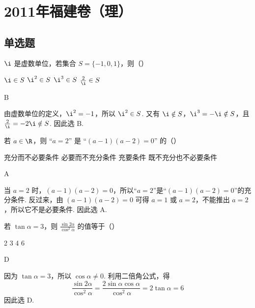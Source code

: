 \chapter{2011年福建卷（理）}

\section{单选题}

\begin{problem}
\(\i\) 是虚数单位，若集合 \(S = \{-1, 0, 1\}\)，则（\quad）

\choices
    {\(\i \in S\)}
    {\(\i^2\in S\)}
    {\(\i^3\in S\)}
    {\(\frac{2}{\i} \in S\)}
\end{problem}

\begin{answer}
B
\end{answer}

\begin{solution}
由虚数单位的定义，\(\i^2=-1\)，所以 \(\i^2\in S\). 又有 \(\i\notin S\)，\(\i^3=-\i\notin S\)，且 \(\frac{2}{\i}=-2\i\notin S\). 因此选 B.
\end{solution}

\begin{problem}
若 \(a \in \R\)，则 “\(a = 2\)” 是 “\((a - 1)(a - 2) = 0\)” 的（\quad）

\choices
    {充分而不必要条件}
    {必要而不充分条件}
    {充要条件}
    {既不充分也不必要条件}
\end{problem}

\begin{answer}
A
\end{answer}

\begin{solution}
当 \(a=2\) 时，\((a-1)(a-2)=0\)，所以“\(a=2\)”是“\((a-1)(a-2)=0\)”的充分条件. 反过来，由 \((a-1)(a-2)=0\) 可得 \(a=1\) 或 \(a=2\)，不能推出 \(a=2\)，所以它不是必要条件. 因此选 A.
\end{solution}

\begin{problem}
若 \(\tan \alpha = 3\)，则 \(\frac{\sin 2\alpha}{\cos^2 \alpha}\) 的值等于（\quad）

\choices
    {2}
    {3}
    {4}
    {6}
\end{problem}

\begin{answer}
D
\end{answer}

\begin{solution}
因为 \(\tan\alpha=3\)，所以 \(\cos\alpha\ne0\). 利用二倍角公式，得
\[
\frac{\sin2\alpha}{\cos^2\alpha}=\frac{2\sin\alpha\cos\alpha}{\cos^2\alpha}=2\tan\alpha=6
\]
因此选 D.
\end{solution}

